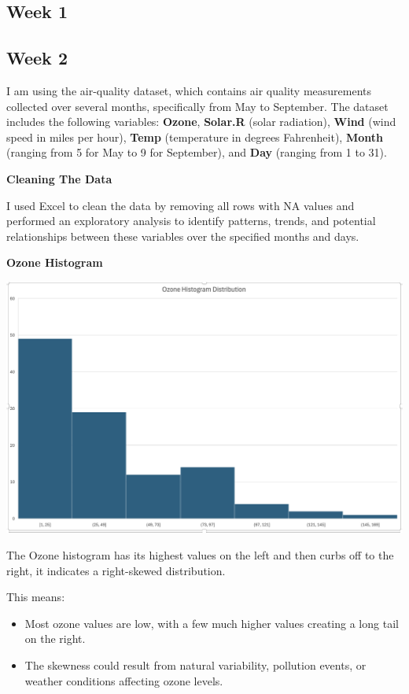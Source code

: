 \documentclass[
  letterpaper,
  DIV=11,
  numbers=noendperiod]{scrreprt}
\providecommand{\tightlist}{%
  \setlength{\itemsep}{0pt}\setlength{\parskip}{0pt}}\usepackage{longtable,booktabs,array}
\begin{document}
\subsection{Week 1}\label{week-1-6}

\subsection{Week 2}\label{week-2-6}

I am using the air-quality dataset, which contains air quality
measurements collected over several months, specifically from May to
September. The dataset includes the following variables: \textbf{Ozone},
\textbf{Solar.R} (solar radiation), \textbf{Wind} (wind speed in miles
per hour), \textbf{Temp} (temperature in degrees Fahrenheit),
\textbf{Month} (ranging from 5 for May to 9 for September), and
\textbf{Day} (ranging from 1 to 31).

\textbf{Cleaning The Data}

I used Excel to clean the data by removing all rows with NA values and
performed an exploratory analysis to identify patterns, trends, and
potential relationships between these variables over the specified
months and days.

\textbf{Ozone Histogram}

\includegraphics{hist_ozone_baruga.png}

The Ozone histogram has its highest values on the left and then curbs
off to the right, it indicates a right-skewed distribution.

This means:

\begin{itemize}
\tightlist
\item
  Most ozone values are low, with a few much higher values creating a
  long tail on the right.
\item
  The skewness could result from natural variability, pollution events,
  or weather conditions affecting ozone levels.
\end{itemize}
\end{document}
